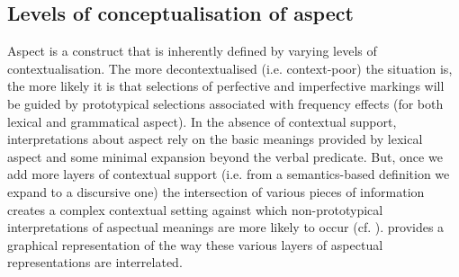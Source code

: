 \documentclass[output=paper,modfonts,nonflat,newtxmath]{langsci/langscibook}
\begin{document}
\subsection{Levels of conceptualisation of aspect}%
\label{sec:salaberry:1.2}


Aspect is a construct that is inherently defined by varying levels of contextualisation. The more decontextualised (i.e. context-poor) the situation is, the more likely it is that selections of perfective and imperfective markings will be guided by prototypical selections associated with frequency effects (for both lexical and grammatical aspect). In the absence of contextual support, interpretations about aspect rely on the basic meanings provided by lexical aspect and some minimal expansion beyond the verbal predicate. But, once we add more layers of contextual support (i.e. from a semantics-based definition we expand to a discursive one) the intersection of various pieces of information creates a complex contextual setting against which non-prototypical interpretations of aspectual meanings are more likely to occur (cf. \citealt{Binnick1991,Doiz2002}).  provides a graphical representation of the way these various layers of aspectual representations are interrelated.

\end{document}
